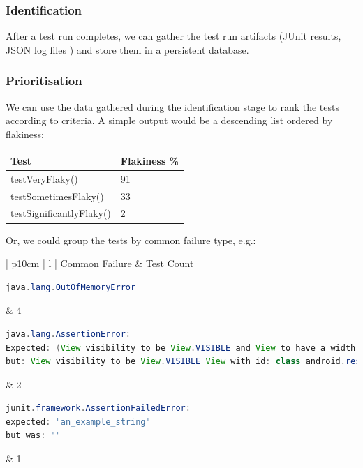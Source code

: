 \subsubsection{Identification}

After a test run completes, we can gather the test run artifacts (JUnit results,
\heisentest JSON log files \etc) and store them in a persistent database.

\subsubsection{Prioritisation}

We can use the data gathered during the identification stage to rank the tests
according to criteria. A simple output would be a descending list ordered by
flakiness:

\begin{center}
    \begin{tabular}{ | l | p{5cm} |}
    \hline
    Test & Flakiness \% \\ \hline
    testVeryFlaky() & 91 \\ \hline
    testSometimesFlaky() & 33 \\ \hline
    testSignificantlyFlaky() & 2 \\ \hline
    \end{tabular}
\end{center}

Or, we could group the tests by common failure type, e.g.:


\begin{center}
    \begin{tabular}{| p{10cm} | l |}
    \hline
    Common Failure & \flaky Test Count \\ \hline
    {\begin{lstlisting}[language=Java, numbers=none]
java.lang.OutOfMemoryError
	\end{lstlisting}}
    & 4 \\ \hline
    {\begin{lstlisting}[language=Java, numbers=none]
java.lang.AssertionError:
Expected: (View visibility to be View.VISIBLE and View to have a width and a height)
but: View visibility to be View.VISIBLE View with id: class android.resources.R$id.anExampleView(1) had a visibility of View.GONE
	\end{lstlisting}}
	& 2 \\ \hline
    {\begin{lstlisting}[language=Java, numbers=none]
junit.framework.AssertionFailedError:
expected: "an_example_string"
but was: ""
	\end{lstlisting}}
	& 1 \\ \hline

    \end{tabular}
\end{center}

